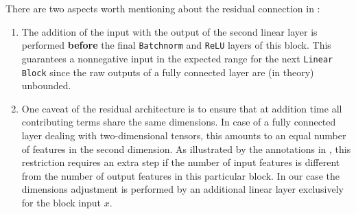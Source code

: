 There are two aspects worth mentioning about the residual connection in :
\begin{enumerate}
  \item The addition of the input with the output of the second linear layer is performed \textbf{before} the final \texttt{Batchnorm} and \texttt{ReLU} layers of this block.
        This guarantees a nonnegative input in the expected range for the next \texttt{Linear Block} since the raw outputs of a fully connected layer are (in theory) unbounded.

  \item One caveat of the residual architecture is to ensure that at addition time all contributing terms share the same dimensions.
        In case of a fully connected layer dealing with two-dimensional tensors, this amounts to an equal number of features in the second dimension.
        As illustrated by the annotations in , this restriction requires an extra step if the number of input features is different from the number of output features in this particular block.
        In our case the dimensions adjustment is performed by an additional linear layer exclusively for the block input $x$.
\end{enumerate}

